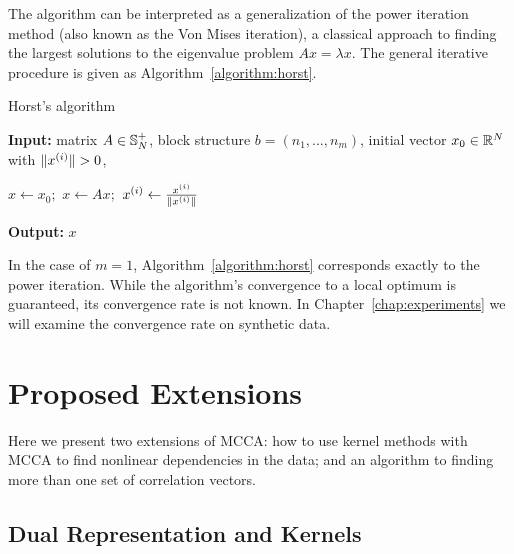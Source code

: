 The algorithm can be interpreted as a generalization of the power
iteration method (also known as the Von Mises iteration), a classical
approach to finding the largest solutions to the eigenvalue problem
$A x = \lambda x$.  The general iterative procedure is given
as Algorithm~\ref{algorithm:horst}.
\begin{algorithm}
\caption{Horst's algorithm}
\label{algorithm:horst}
{\bf Input:} matrix $A \in \mathbb{S}_N^+$, block structure $b = \left(n_1,\ldots,n_m\right)$,
initial vector $x_0 \in \mathbb{R}^N$ with $\lVert x^{(i)}\rVert > 0$,  \par
\begin{algorithmic}
\STATE $x \leftarrow x_0;$
\STATE $x \leftarrow A x;$
\STATE $x^{(i)} \leftarrow \frac{x^{(i)}}{\lVert x^{(i)}\rVert}$
\ENDFOR
\ENDFOR
\end{algorithmic}
{\bf Output:} $x$
\end{algorithm}

In the case of $m=1$, Algorithm~\ref{algorithm:horst}
corresponds exactly to the power iteration. While the algorithm's
convergence to a local optimum is guaranteed, its convergence rate is not known. In
Chapter~\ref{chap:experiments} we will examine the convergence
rate on synthetic data.

\section{Proposed Extensions}

Here we present two extensions of MCCA: how to use kernel methods with
MCCA to find nonlinear dependencies in the data; and an
algorithm to finding more than one set of correlation vectors.
\subsection{Dual Representation and Kernels}\label{chap:extensions:kernels}

